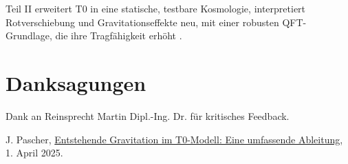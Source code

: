 \documentclass[12pt,a4paper]{article}
\newenvironment{acknowledgments}
{\section*{Danksagungen}}
{\vspace{1em}}
\begin{document}
	Teil II erweitert T0 in eine statische, testbare Kosmologie, interpretiert Rotverschiebung und Gravitationseffekte neu, mit einer robusten QFT-Grundlage, die ihre Tragfähigkeit erhöht \cite{pascher_perspective_2025}.
	
	\begin{acknowledgments}
		Dank an Reinsprecht Martin Dipl.-Ing. Dr. für kritisches Feedback.
	\end{acknowledgments}
	
	
	\begin{thebibliography}{99}

			 J. Pascher, \href{https://github.com/jpascher/T0-Time-Mass-Duality/tree/main/2/pdf/Deutsch/EmergentGravT0De.pdf}{Entstehende Gravitation im T0-Modell: Eine umfassende Ableitung}, 1. April 2025.


\end{thebibliography}
\end{document}
